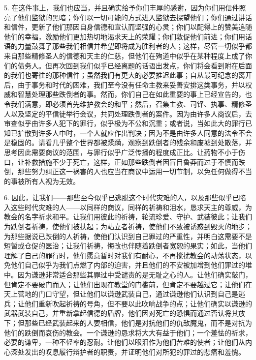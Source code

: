 5. 在这件事上，我们也应当，并且确实给予你们丰厚的感谢，因为你们用信件照亮了他们监狱的黑暗；你们以一切可能的方式进入监狱去探望他们；你们通过讲话和信件，更新了他们那因自身信德和宣认而坚强的心灵；你们以配得上的赞美追随他们的幸福，激励他们更加热切地渴求天上的荣耀；你们敦促他们前进；你们用话语的力量鼓舞了那些我们相信并希望即将成为胜利者的人；这样，尽管一切似乎都来自那些精修圣人的信德和天主的仁慈，但他们在殉道中似乎在某种程度上成了你们的债务人。但再次回到我们似乎已经离题的话语出发点，你们将会看到附在后面的我们也寄往的那种信件；虽然我们有更大的必要推迟此事；自从最可纪念的离开后，由于事务和时代的困难，我们至今没有任命主教来妥善安排这类事务，并以权威和智慧处理那些跌倒者的事。然而，你们自己在如此重要的事上已经宣告的，也令我们满意，即必须首先维护教会的和平；然后，召集主教、司铎、执事、精修圣人以及坚定的平信徒举行会议，共同处理跌倒者的案件。因为由许多人商议后，去审查似乎由许多人犯下的罪行，似乎极为不公和沉重；或者说，当如此大的罪行已知已扩散到许多人中时，一个人就应作出判决；因为不是由许多人同意的法令不会是稳固的。请看几乎整个世界都被蹂躏，观察到跌倒者的残余和废墟到处散落，并思考因此需要商议的范围，与罪行似乎广泛传播的程度成正比。让药物不小于伤口，让补救措施不少于死亡，这样，正如那些跌倒者因盲目鲁莽而过于不慎而跌倒，那些努力纠正这一祸害的人也应当在商议中运用一切节制，以免任何做得不当的事被所有人视为无效。\par

6. 因此，让我们——那些至今似乎已逃脱这个时代灾难的人，以及那些似乎已陷入这些时代灾难的人——以同样的商议，同样的祈祷和泪水，恳求天主的尊威，为教会的名字祈求和平。让我们用彼此的祈祷，轮流珍爱、守护、武装彼此；让我们为跌倒者祈祷，使他们被扶起；为站立者祈祷，使他们不致被诱惑到毁灭的地步；为那些据说已跌倒的人祈祷，使他们认识到自己罪过的严重性，并明白这需要不是短暂或仓促的医治；让我们祈祷，悔改也伴随着跌倒者宽恕的果实；如此，当他们理解了自己的罪行时，他们愿意暂时对我们有耐心，不再搅扰教会的动荡状态，以免他们自己似乎为我们点燃了内部的迫害，并且他们的不安被加增到他们罪过的堆中。因为谦逊非常适合那些其罪过中受谴责的是无耻之心的人。让他们确实敲门，但肯定不要破门而入；让他们出现在教堂的门槛前，但肯定不要越过它；让他们在天上营地的门口守望，但让他们以谦逊武装自己，通过谦逊他们认识到自己是逃兵；让他们重新吹起祈祷的号角，但不要以此吹响战争的点；让他们确实以谦逊的武器武装自己，并重新拿起信德的盾牌，他们因对死亡的恐惧而通过否认将其放下；但那些已经武装起来的人要相信，他们是对抗他们的仇敌魔鬼，而不是对抗为他们的跌倒而哀伤的教会。一个谦逊的恳求将大大有益于他们；一个羞怯的祈求，必要的谦卑，一种不轻率的忍耐。让他们以眼泪作为他们苦难的使者；让他们从内心深处发出的叹息履行辩护者的职责，并证明他们对所犯的罪过的悲痛和羞愧。\par

